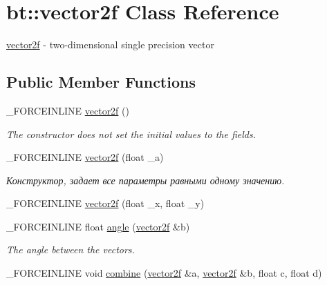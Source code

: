 \hypertarget{classbt_1_1vector2f}{\section{bt\-:\-:vector2f Class Reference}
\label{classbt_1_1vector2f}
}


\hyperlink{classbt_1_1vector2f}{vector2f} -\/ two-\/dimensional single precision vector  


\subsection*{Public Member Functions}
\begin{DoxyCompactItemize}
\item 
\hypertarget{classbt_1_1vector2f_a713648195281268f45de81370619687c}{\-\_\-\-F\-O\-R\-C\-E\-I\-N\-L\-I\-N\-E \hyperlink{classbt_1_1vector2f_a713648195281268f45de81370619687c}{vector2f} ()}\label{classbt_1_1vector2f_a713648195281268f45de81370619687c}

\begin{DoxyCompactList}\small\item\em The constructor does not set the initial values to the fields. \end{DoxyCompactList}\item 
\hypertarget{classbt_1_1vector2f_ab17291e27c3dba3be1a8264f220746c2}{\-\_\-\-F\-O\-R\-C\-E\-I\-N\-L\-I\-N\-E \hyperlink{classbt_1_1vector2f_ab17291e27c3dba3be1a8264f220746c2}{vector2f} (float \-\_\-a)}\label{classbt_1_1vector2f_ab17291e27c3dba3be1a8264f220746c2}

\begin{DoxyCompactList}\small\item\em Конструктор, задает все параметры равными одному значению. \end{DoxyCompactList}\item 
\-\_\-\-F\-O\-R\-C\-E\-I\-N\-L\-I\-N\-E \hyperlink{classbt_1_1vector2f_a948e93bdc8c6c308248bb7f05b5b5646}{vector2f} (float \-\_\-x, float \-\_\-y)
\item 
\hypertarget{classbt_1_1vector2f_a806460dd8df454775fa6f84be4cd2a1f}{\-\_\-\-F\-O\-R\-C\-E\-I\-N\-L\-I\-N\-E float \hyperlink{classbt_1_1vector2f_a806460dd8df454775fa6f84be4cd2a1f}{angle} (\hyperlink{classbt_1_1vector2f}{vector2f} \&b)}\label{classbt_1_1vector2f_a806460dd8df454775fa6f84be4cd2a1f}

\begin{DoxyCompactList}\small\item\em The angle between the vectors. \end{DoxyCompactList}\item 
\hypertarget{classbt_1_1vector2f_ad55c93b6b432fe3e8f2e38c65efb6721}{\-\_\-\-F\-O\-R\-C\-E\-I\-N\-L\-I\-N\-E void \hyperlink{classbt_1_1vector2f_ad55c93b6b432fe3e8f2e38c65efb6721}{combine} (\hyperlink{classbt_1_1vector2f}{vector2f} \&a, \hyperlink{classbt_1_1vector2f}{vector2f} \&b, float c, float d)}\label{classbt_1_1vector2f_ad55c93b6b432fe3e8f2e38c65efb6721}


\end{DoxyCompactItemize}
